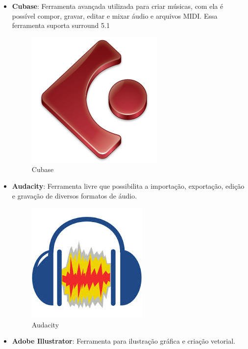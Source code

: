 \documentclass[11pt]{article} %
\begin{document}
\begin{itemize}
\item \textbf{Cubase}: Ferramenta avançada utilizada para criar músicas, com ela é possível compor, gravar, editar e mixar áudio e arquivos MIDI. Essa ferramenta suporta surround 5.1

\begin{figure}[!htp]
\centering
\includegraphics[scale=0.3]{imagens/cubase-Logo.png}
\caption{Cubase}
\label{Cubase}
\end{figure}

\item \textbf{Audacity}: Ferramenta livre que possibilita a importação, exportação, edição e gravação de diversos formatos de áudio.

\begin{figure}[!htp]
\centering
\includegraphics[scale=0.3]{imagens/audacity.jpg}
\caption{Audacity}
\label{Audacity}
\end{figure}

\item \textbf{Adobe Illustrator}: Ferramenta para ilustração gráfica e criação vetorial.


\end{itemize}
\end{document}
